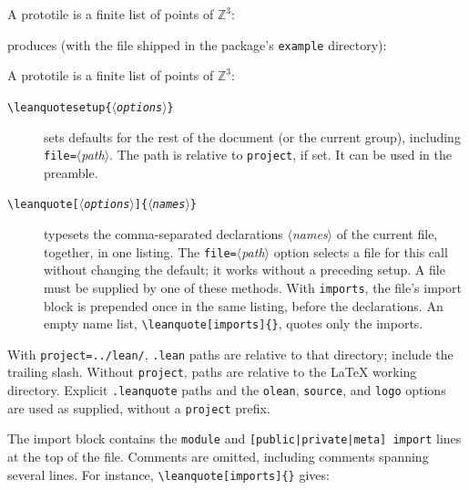 \documentclass[11pt]{article}
\newcommand{\meta}[1]{\ensuremath{\langle}\textit{#1}\ensuremath{\rangle}}
\newcommand{\cs}[1]{\texttt{\textbackslash #1}}
\newcommand{\opt}[1]{\texttt{#1}}
\begin{document}
\begin{latexsrc}
\usepackage{leanquote}

A prototile is a finite list of points of $\mathbb{Z}^3$:
\end{latexsrc}

\noindent\begin{minipage}{\linewidth}
\noindent produces (with the file shipped in the package's \texttt{example} directory):

A prototile is a finite list of points of $\mathbb{Z}^3$:
\end{minipage}

\medskip
\begin{description}
\item[\cs{leanquotesetup}\texttt{\{\meta{options}\}}]
  sets defaults for the rest of the document (or the current group), including
  \opt{file=}\meta{path}. The path is relative to \opt{project}, if set.
  It can be used in the preamble.
\item[\cs{leanquote}\texttt{[\meta{options}]\{\meta{names}\}}]
  typesets the comma-separated declarations \meta{names} of the current file, together, in one
  listing. The \opt{file=}\meta{path} option selects a file for this call without changing
  the default; it works without a preceding setup. A file must be supplied
  by one of these methods. With \opt{imports}, the file's import block is prepended
  once in the same listing, before the declarations. An empty name list,
  \verb|\leanquote[imports]{}|, quotes only the imports.
\end{description}

\begin{latexsrc}
\leanquote[imports,file=Other.lean]{}
\end{latexsrc}

With \opt{project=../lean/}, \texttt{.lean} paths are relative to that directory;
include the trailing slash. Without \opt{project}, paths are relative to the
\LaTeX{} working directory. Explicit \texttt{.leanquote} paths and the \opt{olean},
\opt{source}, and \opt{logo} options are used as supplied, without a \opt{project} prefix.

The import block contains the \texttt{module} and \texttt{[public|private|meta] import}
lines at the top of the file. Comments are omitted, including comments spanning several
lines. For instance, \verb|\leanquote[imports]{}| gives:
\end{document}
